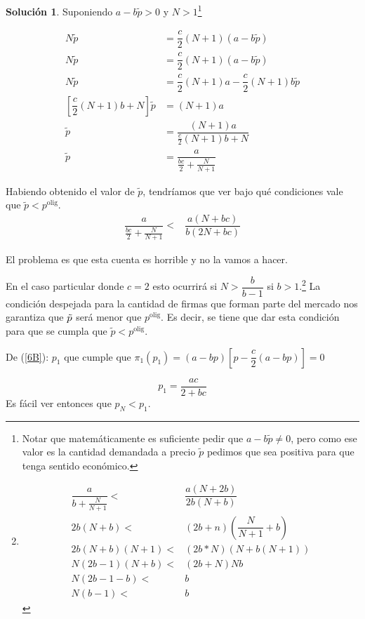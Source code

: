 \documentclass[a4paper, 11pt]{article}
\theoremstyle{definition}
\newtheorem{solucion}{Soluci\'on}
\newcommand{\p}[1]{\left(#1\right)}
\newcommand{\cor}[1]{\left[#1\right]}
\begin{document}
\begin{solucion}
Suponiendo $a-b\widetilde{p}>0$ y $N>1$\footnote{Notar que matemáticamente es suficiente pedir que $a-b\widetilde{p}\neq 0$, pero como ese valor es la cantidad demandada a precio $\widetilde{p}$ pedimos que sea positiva para que tenga sentido económico.}

\vspace*{-16pt}

\begin{align*}
N\widetilde{p}&=\dfrac{c}{2}(N+1)(a-b\widetilde{p})\\
N\widetilde{p}&=\dfrac{c}{2}(N+1)(a-b\widetilde{p})\\
N\widetilde{p}&=\dfrac{c}{2}(N+1)a-\dfrac{c}{2}(N+1)b\widetilde{p}\\
\left[\dfrac{c}{2}(N+1)b+N\right]\widetilde{p}&=(N+1)a\\
\widetilde{p}&=\dfrac{(N+1)a}{\frac{c}{2}(N+1)b+N}\\
\widetilde{p}&=\dfrac{a}{\frac{bc}{2}+\frac{N}{N+1}}
\end{align*}
 
Habiendo obtenido el valor de $\widetilde{p}$, tendríamos que ver bajo qué condiciones vale que  $\widetilde{p}<p^{\text{olig}}$. 
\vspace*{-8pt}
\begin{align*}
\dfrac{a}{\frac{bc}{2}+\frac{N}{N+1}}<& \dfrac{a(N+bc)}{b(2N+bc)}
\end{align*}

El problema es que esta cuenta es horrible y no la vamos a hacer.

En el caso particular donde $c=2$ esto ocurrirá si $N>\dfrac{b}{b-1}$ si $b>1$.\footnote{\begin{align*}
\dfrac{a}{b+\frac{N}{N+1}}<& \dfrac{a(N+2b)}{2b(N+b)}\\
    2b(N+b)<&(2b+n)\p{\dfrac{N}{N+1}+b}\\
    2b(N+b)(N+1)<&(2b*N)(N+b(N+1))\\
    N(2b-1)(N+b)<&(2b+N)Nb\\
    N(2b-1-b)<&b\\
    N(b-1)<&b
\end{align*}} La condición despejada para la cantidad de firmas que forman parte del mercado nos garantiza que $\Tilde{p}$ será menor que $p^{\text{olig}}$. Es decir, se tiene que dar esta condición para que se cumpla que $\widetilde{p}<p^{\text{olig}}$.

De (\ref{6B}): $p_1$ que cumple que $\pi_1(p_1)=(a-bp)\cor{p-\dfrac{c}{2}(a-bp)}=0$


\[p_1=\dfrac{ac}{2+bc}\]
Es fácil ver entonces que $p_N<p_1$.


\end{solucion}
\end{document}
